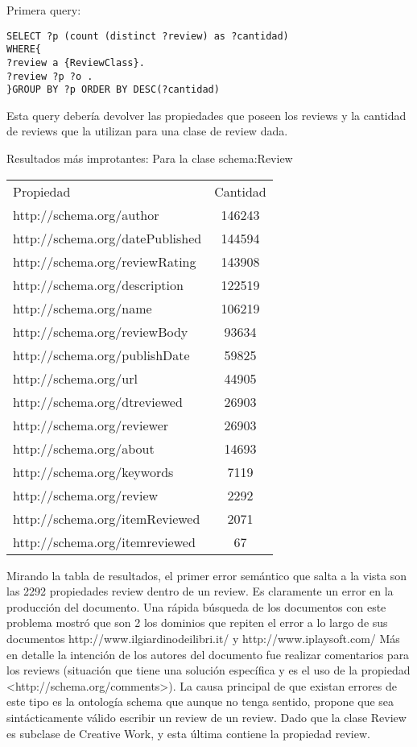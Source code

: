 Primera query:

\begin{lstlisting}[frame=single]
SELECT ?p (count (distinct ?review) as ?cantidad) 
WHERE{
?review a {ReviewClass}.
?review ?p ?o .
}GROUP BY ?p ORDER BY DESC(?cantidad)
\end{lstlisting}

Esta query debería devolver las propiedades que poseen los reviews y la cantidad de reviews que la utilizan para una clase de review dada.

Resultados más improtantes:
Para la clase schema:Review
\begin{tabular}{| l | c | }
 Propiedad & Cantidad \\
 http://schema.org/author & 146243 \\
 http://schema.org/datePublished & 144594 \\
 http://schema.org/reviewRating & 143908 \\
 http://schema.org/description & 122519 \\
 http://schema.org/name & 106219 \\
 http://schema.org/reviewBody & 93634 \\
 http://schema.org/publishDate & 59825 \\
 http://schema.org/url & 44905 \\
 http://schema.org/dtreviewed & 26903 \\
 http://schema.org/reviewer & 26903 \\
 http://schema.org/about & 14693 \\
 http://schema.org/keywords & 7119 \\
 http://schema.org/review & 2292 \\
 http://schema.org/itemReviewed & 2071 \\
 http://schema.org/itemreviewed & 67 
\end{tabular}

 Mirando la tabla de resultados, el primer error semántico que salta a la vista son las 2292 propiedades review dentro de un review. 
 Es claramente un error en la producción del documento. 
 Una rápida búsqueda de los documentos con este problema mostró que son 2 los dominios que repiten el error a lo largo de sus documentos
 http://www.ilgiardinodeilibri.it/ y http://www.iplaysoft.com/
 Más en detalle la intención de los autores del documento fue realizar comentarios para los reviews (situación que tiene una solución específica 
 y es el uso de la propiedad <http://schema.org/comments>). 
 La causa principal de que existan errores de este tipo es la ontología schema que aunque no tenga sentido, propone que sea sintácticamente válido
 escribir un review de un review. Dado que la clase Review es subclase de Creative Work, y esta última contiene la propiedad review.
 
